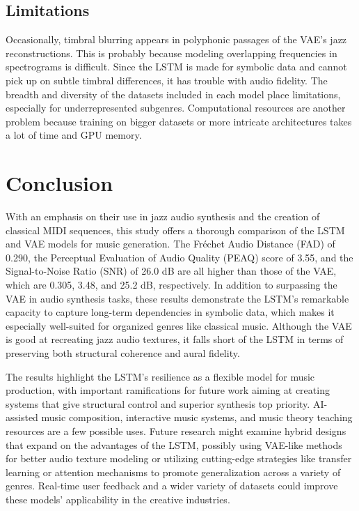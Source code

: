 \documentclass[conference]{IEEEtran}
\begin{document}
\subsection{Limitations}
Occasionally, timbral blurring appears in polyphonic passages of the VAE's jazz reconstructions. This is probably because modeling overlapping frequencies in spectrograms is difficult.  Since the LSTM is made for symbolic data and cannot pick up on subtle timbral differences, it has trouble with audio fidelity.  The breadth and diversity of the datasets included in each model place limitations, especially for underrepresented subgenres.  Computational resources are another problem because training on bigger datasets or more intricate architectures takes a lot of time and GPU memory.

\section{Conclusion}
With an emphasis on their use in jazz audio synthesis and the creation of classical MIDI sequences, this study offers a thorough comparison of the LSTM and VAE models for music generation.  The Fréchet Audio Distance (FAD) of 0.290, the Perceptual Evaluation of Audio Quality (PEAQ) score of 3.55, and the Signal-to-Noise Ratio (SNR) of 26.0 dB are all higher than those of the VAE, which are 0.305, 3.48, and 25.2 dB, respectively. In addition to surpassing the VAE in audio synthesis tasks, these results demonstrate the LSTM's remarkable capacity to capture long-term dependencies in symbolic data, which makes it especially well-suited for organized genres like classical music.  Although the VAE is good at recreating jazz audio textures, it falls short of the LSTM in terms of preserving both structural coherence and aural fidelity.

The results highlight the LSTM's resilience as a flexible model for music production, with important ramifications for future work aiming at creating systems that give structural control and superior synthesis top priority.  AI-assisted music composition, interactive music systems, and music theory teaching resources are a few possible uses.  Future research might examine hybrid designs that expand on the advantages of the LSTM, possibly using VAE-like methods for better audio texture modeling or utilizing cutting-edge strategies like transfer learning or attention mechanisms to promote generalization across a variety of genres.  Real-time user feedback and a wider variety of datasets could improve these models' applicability in the creative industries.



\end{document}
